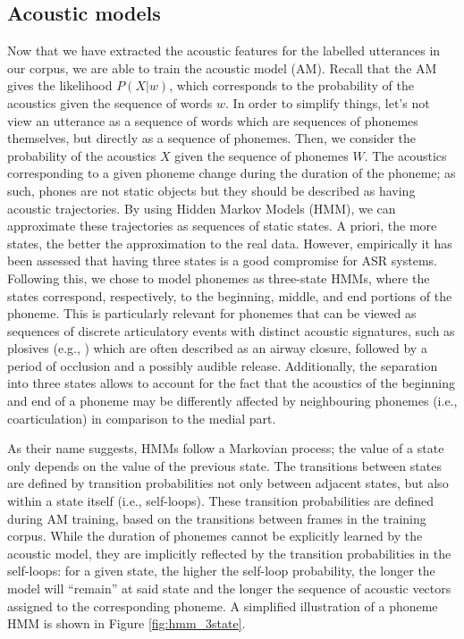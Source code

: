 \subsection{Acoustic models}

Now that we have extracted the acoustic features for the labelled utterances in our corpus, we are able to train the acoustic model (AM). Recall that the AM gives the likelihood $P(X|w)$, which corresponds to the probability of the acoustics given the sequence of words $w$.
In order to simplify things, let's not view an utterance as a sequence of words which are sequences of phonemes themselves, but directly as a sequence of phonemes. Then, we consider the probability of the acoustics $X$ given the sequence of phonemes $W$.
The acoustics corresponding to a given phoneme change during the duration of the phoneme; as such, phones are not static objects but they should be described as having acoustic trajectories. By using Hidden Markov Models (HMM), we can approximate these trajectories as sequences of static states. A priori, the more states, the better the approximation to the real data. However, empirically it has been assessed that having three states is a good compromise for ASR systems. Following this, we chose to model phonemes as three-state HMMs, where the states correspond, respectively, to the beginning, middle, and end portions of the phoneme. This is particularly relevant for phonemes that can be viewed as sequences of discrete articulatory events with distinct acoustic signatures, such as plosives (e.g., ) which are often described as an airway closure, followed by a period of occlusion and a possibly audible release. Additionally, the separation into three states allows to account for the fact that the acoustics of the beginning and end of a phoneme may be differently affected by neighbouring phonemes (i.e., coarticulation) in comparison to the medial part. 

As their name suggests, HMMs follow a Markovian process; the value of a state only depends on the value of the previous state. The transitions between states are defined by transition probabilities not only between adjacent states, but also within a state itself (i.e., self-loops). These transition probabilities are defined during AM training, based on the transitions between frames in the training corpus. While the duration of phonemes cannot be explicitly learned by the acoustic model, they are implicitly reflected by the transition probabilities in the self-loops: for a given state, the higher the self-loop probability, the longer the model will ``remain'' at said state and the longer the sequence of acoustic vectors assigned to the corresponding phoneme. A simplified illustration of a phoneme HMM is shown in Figure \ref{fig:hmm_3state}.

